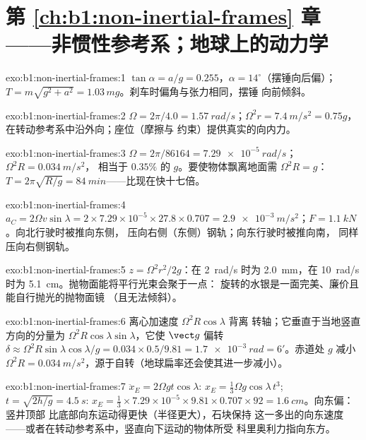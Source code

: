 \section*{第 \ref{ch:b1:non-inertial-frames} 章——非惯性参考系；地球上的动力学}

\begin{solution}{exo:b1:non-inertial-frames:1}
$\tan\alpha = a/g = 0.255$，$\alpha = 14^\circ$（摆锤向后偏）；
$T = m\sqrt{g^2 + a^2} = 1.03\,mg$。刹车时偏角与张力相同，摆锤
向前倾斜。
\end{solution}

\begin{solution}{exo:b1:non-inertial-frames:2}
$\Omega = 2\pi/4.0 = \qty{1.57}{rad/s}$；$\Omega^2r = \qty{7.4}{m/s^2} = 0.75g$，
在转动参考系中沿外向；座位（摩擦与
约束）提供真实的向内力。
\end{solution}

\begin{solution}{exo:b1:non-inertial-frames:3}
$\Omega = 2\pi/86164 = \qty{7.29e-5}{rad/s}$；$\Omega^2R = \qty{0.034}{m/s^2}$，
相当于 $0.35\%$ 的 $g$。要使物体飘离地面需 $\Omega^2R = g$：$T = 2\pi\sqrt{R/g} =
\qty{84}{min}$——比现在快十七倍。
\end{solution}

\begin{solution}{exo:b1:non-inertial-frames:4}
$a_C = 2\Omega v\sin\lambda = 2 \times 7.29\times10^{-5} \times 27.8 \times 0.707
= \qty{2.9e-3}{m/s^2}$；$F = \qty{1.1}{kN}$。向北行驶时被推向东侧，
压向右侧（东侧）钢轨；向东行驶时被推向南，
同样压向右侧钢轨。
\end{solution}

\begin{solution}{exo:b1:non-inertial-frames:5}
$z = \Omega^2r^2/2g$：在 \qty{2}{rad/s} 时为 \qty{2.0}{mm}，在
\qty{10}{rad/s} 时为 \qty{5.1}{cm}。抛物面能将平行光束会聚于一点：
旋转的水银是一面完美、廉价且能自行抛光的抛物面镜
（且无法倾斜）。
\end{solution}

\begin{solution}{exo:b1:non-inertial-frames:6}
离心加速度 $\Omega^2R\cos\lambda$ 背离
转轴；它垂直于当地竖直方向的分量为 $\Omega^2R\cos\lambda
\sin\lambda$，它使 $\vect g$ 偏转 $\delta \approx \Omega^2R\sin\lambda\cos\lambda/g
= 0.034 \times 0.5/9.81 = \qty{1.7e-3}{rad} = 6'$。赤道处 $g$ 减小
$\Omega^2R = \qty{0.034}{m/s^2}$，源于自转（地球扁率还会使其进一步减小）。
\end{solution}

\begin{solution}{exo:b1:non-inertial-frames:7}
$\ddot x_E = 2\Omega gt\cos\lambda$: $x_E = \tfrac13\Omega g\cos\lambda\,t^3$; $t =
\sqrt{2h/g} = \qty{4.5}{s}$: $x_E = \tfrac13 \times 7.29\times10^{-5} \times 9.81
\times 0.707 \times 92 = \qty{1.6}{cm}$。向东偏：竖井顶部
比底部向东运动得更快（半径更大），石块保持
这一多出的向东速度——或者在转动参考系中，竖直向下运动的物体所受
科里奥利力指向东方。
\end{solution}

